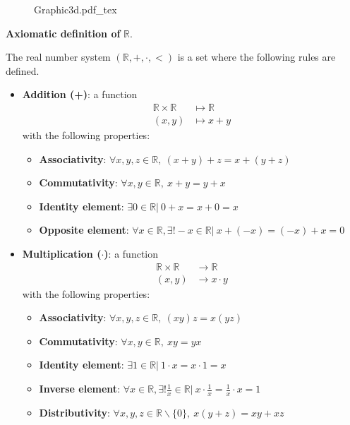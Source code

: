\documentclass[12pt, a4paper]{book}
\newcommand{\incfig}[1]{%
\def\svgscale{1}
{#1.pdf_tex}
}
\begin{document}
\begin{figure}[H]
  \centering
  \incfig{Graphic3d}
\end{figure}

\begin{defn}
  \textbf{Axiomatic definition of }$\mathbb{R}$.

  The real number system $(\mathbb{R}, +, \cdot, <)$ is a set where the following rules are defined.

  \begin{itemize}
    \item \textbf{Addition (+)}: a function
    \begin{align*}
      \mathbb{R}\times \mathbb{R} &\mapsto \mathbb{R} \\
      (x,y) &\mapsto x+y
    \end{align*}
    with the following properties:
    \begin{itemize}
      \item \textbf{Associativity}: $\forall x,y,z \in \mathbb{R}, \ (x+y)+z=x+(y+z)$
      \item \textbf{Commutativity}: $\forall x,y \in \mathbb{R}, \ x+y=y+x$
      \item \textbf{Identity element}: $\exists 0 \in \mathbb{R}\vert\ 0+x=x+0=x$
      \item \textbf{Opposite element}: $\forall x \in \mathbb{R}, \exists! -x\in\mathbb{R}\vert \ x+(-x)=(-x)+x=0$
    \end{itemize}

    \item \textbf{Multiplication ($\cdot$)}: a function 
    \begin{align*}
      \mathbb{R}\times \mathbb{R} &\longrightarrow \mathbb{R} \\
      (x,y) &\longrightarrow x \cdot y
    \end{align*}
    with the following properties:
    \begin{itemize}
      \item \textbf{Associativity}: $\forall x,y,z \in \mathbb{R}, \ (xy)z=x(yz)$
      \item \textbf{Commutativity}: $\forall x,y \in \mathbb{R}, \ xy=yx$
      \item \textbf{Identity element}: $\exists 1 \in \mathbb{R}\vert \ 1\cdot x=x\cdot 1=x$
      \item \textbf{Inverse element}: $\forall x \in \mathbb{R}, \exists! \frac{1}{x}\in\mathbb{R}\vert \ x\cdot \frac{1}{x} = \frac{1}{x} \cdot x = 1$
      \item \textbf{Distributivity}: $\forall x,y,z \in \mathbb{R}\backslash \{0\}, \ x(y+z)=xy + xz$
    \end{itemize}


\end{itemize}
\end{defn}
\end{document}
